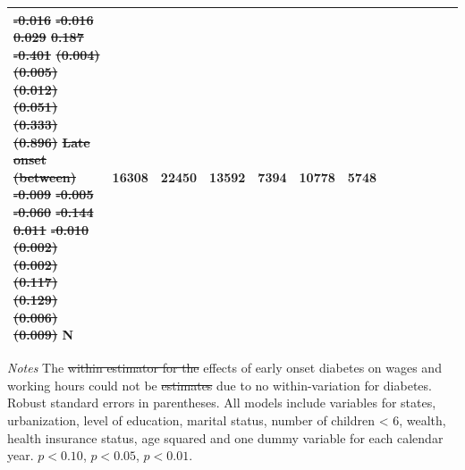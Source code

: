 \documentclass[12pt,english]{article}
\providecommand{\DIFaddtex}[1]{{\protect\color{blue}\uwave{#1}}} %
\providecommand{\DIFdeltex}[1]{{\protect\color{red}\sout{#1}}}                      %
\providecommand{\DIFaddFL}[1]{\DIFadd{#1}} %
\providecommand{\DIFdelFL}[1]{\DIFdel{#1}} %
\providecommand{\DIFaddbeginFL}{} %
\providecommand{\DIFaddendFL}{} %
\providecommand{\DIFdelbeginFL}{} %
\providecommand{\DIFdelendFL}{} %
\providecommand{\DIFadd}[1]{\texorpdfstring{\DIFaddtex{#1}}{#1}} %
\providecommand{\DIFdel}[1]{\texorpdfstring{\DIFdeltex{#1}}{}} %
\begin{document}
\begin{table}[p]
\begin{center}
\begin{adjustbox}{max width=\linewidth}
\begin{threeparttable}
{\begin{tabular}{l*{6}{S S}}
\DIFdelFL{-0.016}%
\DIFdelFL{-0.016         }%
\DIFdelFL{0.029         }%
\DIFdelFL{0.187         }%
\DIFdelFL{-0.401         }%
\DIFdelFL{(0.004)         }%
\DIFdelFL{(0.005)         }%
\DIFdelFL{(0.012)         }%
\DIFdelFL{(0.051)         }%
\DIFdelFL{(0.333)         }%
\DIFdelFL{(0.896)         }%
\DIFdelFL{Late onset (between)}%
\DIFdelFL{-0.009}%
\DIFdelFL{-0.005}%
\DIFdelFL{-0.060         }%
\DIFdelFL{-0.144         }%
\DIFdelFL{0.011}%
\DIFdelFL{-0.010         }%
\DIFdelFL{(0.002)         }%
\DIFdelFL{(0.002)         }%
\DIFdelFL{(0.117)         }%
\DIFdelFL{(0.129)         }%
\DIFdelFL{(0.006)         }%
\DIFdelFL{(0.009)         }%
\DIFdelendFL \midrule
						N         &    16308         &    22450         &    13592         &     7394         &    10778         &     5748         \\
						\bottomrule
					\end{tabular}
					\begin{tablenotes}
						\item \footnotesize \textit{Notes} The \DIFdelbeginFL \DIFdelFL{within estimator for the }\DIFdelendFL effects of early onset diabetes on wages and working hours could not be \DIFdelbeginFL \DIFdelFL{estimates }\DIFdelendFL \DIFaddbeginFL \DIFaddFL{estimated }\DIFaddendFL due to no within-variation for diabetes. Robust standard errors in parentheses. All models include variables for  states, urbanization, level of education, marital status, number of children < 6, wealth, health insurance status, age squared and one dummy variable for each calendar year. \sym{*} \(p<0.10\), \sym{**} \(p<0.05\), \sym{***} \(p<0.01\).
					\end{tablenotes}
				}
			\end{threeparttable}
		\end{adjustbox}
	\end{center}
\end{table}
\end{document}
